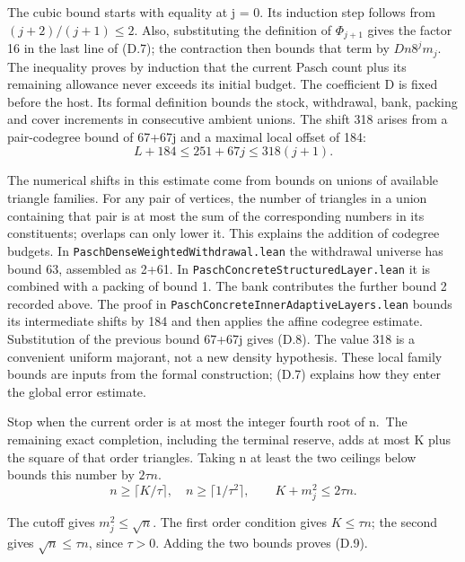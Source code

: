 \documentclass[english,11pt,a4paper]{article}
\begin{document}
The cubic bound starts with equality at j = 0. Its induction step follows from \((j+2)/(j+1)\leq2\). Also, substituting the definition of \(\Phi_{j+1}\) gives the factor 16 in the last line of (D.7); the contraction then bounds that term by \(Dn8^jm_j\). The inequality proves by induction that the current Pasch count plus its remaining allowance never exceeds its initial budget. The coefficient D is fixed before the host. Its formal definition bounds the stock, withdrawal, bank, packing and cover increments in consecutive ambient unions. The shift 318 arises from a pair-codegree bound of 67+67j and a maximal local offset of 184:
\[L+184\leq251+67j\leq318(j+1).\tag{D.8}\]

The numerical shifts in this estimate come from bounds on unions of available triangle families. For any pair of vertices, the number of triangles in a union containing that pair is at most the sum of the corresponding numbers in its constituents; overlaps can only lower it. This explains the addition of codegree budgets. In \texttt{Pasch\allowbreak{}Dense\allowbreak{}Weighted\allowbreak{}Withdrawal.\allowbreak{}lean} the withdrawal universe has bound 63, assembled as 2+61. In \texttt{Pasch\allowbreak{}Concrete\allowbreak{}Structured\allowbreak{}Layer.\allowbreak{}lean} it is combined with a packing of bound 1. The bank contributes the further bound 2 recorded above. The proof in \texttt{Pasch\allowbreak{}Concrete\allowbreak{}Inner\allowbreak{}Adaptive\allowbreak{}Layers.\allowbreak{}lean} bounds its intermediate shifts by 184 and then applies the affine codegree estimate. Substitution of the previous bound 67+67j gives (D.8). The value 318 is a convenient uniform majorant, not a new density hypothesis. These local family bounds are inputs from the formal construction; (D.7) explains how they enter the global error estimate.

Stop when the current order is at most the integer fourth root of n.~The remaining exact completion, including the terminal reserve, adds at most K plus the square of that order triangles. Taking n at least the two ceilings below bounds this number by \(2\tau n\).
\[n\geq\lceil K/\tau\rceil,\quad n\geq\lceil1/\tau^2\rceil,\qquad K+m_j^2\leq2\tau n.\tag{D.9}\]

The cutoff gives \(m_j^2\leq\sqrt n\). The first order condition gives \(K\leq\tau n\); the second gives \(\sqrt n\leq\tau n\), since \(\tau>0\). Adding the two bounds proves (D.9).
\end{document}
